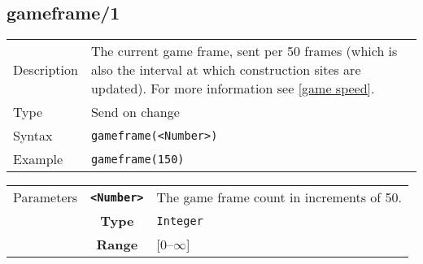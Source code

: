 \subsection{gameframe/1}
\begin{tabularx}{\textwidth}{lX}
 Description & The current game frame, sent per 50 frames (which is also the interval at which construction sites are updated). For more information see \ref{game speed}. \\
 Type & Send on change \\
 Syntax & \verb|gameframe(<Number>)| \\
 Example & \verb|gameframe(150)|   \\
 \end{tabularx}
 \begin{tabularx}{\textwidth}{l | c | p{8cm}|}
 \cline{2-3}
  Parameters & \textbf{\verb|<Number>|} & The game frame count in increments of 50. \\
             & \textbf{Type} & \verb|Integer| \\
             & \textbf{Range} & [0--$\infty$] \\
            \cline{2-3}
\end{tabularx}

